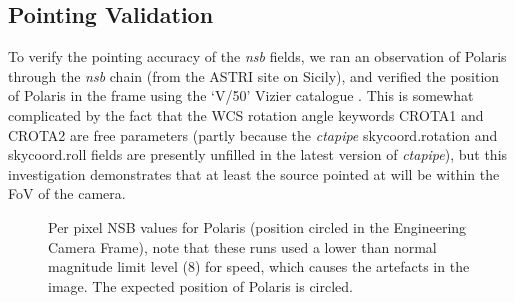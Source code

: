 \subsection{Pointing Validation}
To verify the pointing accuracy of the \textit{nsb} fields, we ran an observation of Polaris through the \textit{nsb} chain (from the ASTRI site on Sicily), and verified the position of Polaris in the frame using the `V/50' Vizier catalogue \cite{vizier}. This is somewhat complicated by the fact that the WCS rotation angle keywords CROTA1 and CROTA2 are free parameters (partly because the \textit{ctapipe} skycoord.rotation and skycoord.roll fields are presently unfilled in the latest version of \textit{ctapipe}), but this investigation demonstrates that at least the source pointed at will be within the FoV of the camera.
\begin{figure}[ht!]
\begin{centering}
\caption{Per pixel NSB values for Polaris (position circled in the Engineering Camera Frame), note that these runs used a lower than normal magnitude limit level (8) for speed, which causes the artefacts in the image. The expected position of Polaris is circled.}
\label{fig:polaris}
\end{centering}
\end{figure} 


